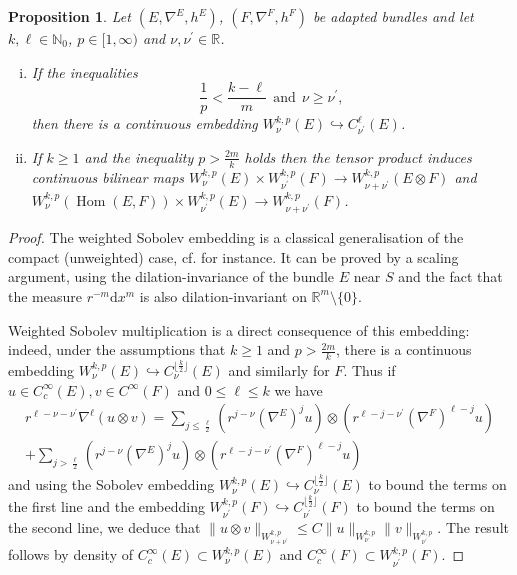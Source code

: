 \documentclass{article}
\numberwithin{equation}{section}        %
\theoremstyle{bfnote}
\newtheorem{prop}[thm]{Proposition}         %
\theoremstyle{definition}
\theoremstyle{bfremark}
\newcommand{\N}{\mathbb{N}}                 %
\newcommand{\R}{\mathbb{R}}                 %
\newcommand{\diff}{\mathrm{d}}                      %
\DeclareMathOperator{\Hom}{Hom}                 %
\begin{document}
\begin{prop}        \label{prop: Sobolev embedding and multiplication}
	Let $(E,\nabla^E,h^E)$, $(F,\nabla^F,h^F)$ be adapted bundles and let $k,\ell \in \N_0$, $p \in [1,\infty)$ and $\nu, \nu^\prime \in \R$.
    \begin{enumerate}[(i)]
        \item If the inequalities
        \begin{equation*} 
		      \frac{1}{p} < \frac{k-\ell}{m} ~~ \text{and} ~~ \nu \geq \nu^\prime,
        \end{equation*}
        then there is a continuous embedding $W^{k,p}_\nu(E) \hookrightarrow C^\ell_{\nu^\prime}(E)$.

        \item If $k \geq 1$ and the inequality $p > \frac{2m}{k}$ holds then the tensor product induces continuous bilinear maps $W^{k,p}_\nu(E) \times W^{k,p}_{\nu^\prime}(F) \to W^{k,p}_{\nu+\nu^\prime}(E \otimes F)$ and $W^{k,p}_\nu(\Hom(E,F)) \times W^{k,p}_{\nu^\prime}(E) \to W^{k,p}_{\nu+\nu^\prime}(F)$.
    \end{enumerate}
\end{prop}

\begin{proof}
    The weighted Sobolev embedding is a classical generalisation of the compact (unweighted) case, cf. \cite[Th. 1.2]{Bartnik1986mass_of_ALF} for instance. It can be proved by a scaling argument, using the dilation-invariance of the bundle $E$ near $S$ and the fact that the measure $r^{-m} \diff x^m$ is also dilation-invariant on $\R^m \setminus \{0\}$.
    
    Weighted Sobolev multiplication is a direct consequence of this embedding: indeed, under the assumptions that $k \geq 1$ and $p > \frac{2m}{k}$, there is a continuous embedding $W^{k,p}_\nu(E) \hookrightarrow C^{\lfloor\frac{k}{2}\rfloor}_\nu(E)$ and similarly for $F$. Thus if $u \in C^\infty_c(E), v \in C^\infty(F)$ and $0 \leq \ell \leq k$ we have
    \begin{multline*}
        r^{\ell-\nu-\nu^\prime} \nabla^\ell(u \otimes v) = \sum_{j \leq \frac{\ell}{2}} (r^{j-\nu} (\nabla^E)^j u) \otimes (r^{\ell-j-\nu^\prime} (\nabla^F)^{\ell-j} u) \\ + \sum_{j > \frac{\ell}{2}} (r^{j-\nu} (\nabla^E)^j u) \otimes (r^{\ell-j-\nu^\prime} (\nabla^F)^{\ell-j} u)
    \end{multline*}
    and using the Sobolev embedding $W^{k,p}_\nu(E) \hookrightarrow C^{\lfloor\frac{k}{2}\rfloor}_\nu(E)$ to bound the terms on the first line and the embedding $W^{k,p}_{\nu^\prime}(F) \hookrightarrow C^{\lfloor\frac{k}{2}\rfloor}_{\nu^\prime}(F)$ to bound the terms on the second line, we deduce that $\|u \otimes v \|_{W^{k,p}_{\nu+\nu^\prime}} \leq C \|u\|_{W^{k,p}_\nu} \|v\|_{W^{k,p}_{\nu^\prime}}$. The result follows by density of $C^\infty_c(E) \subset W^{k,p}_\nu(E)$ and $C^\infty_c(F) \subset W^{k,p}_{\nu^\prime}(F)$.
\end{proof}
\end{document}
